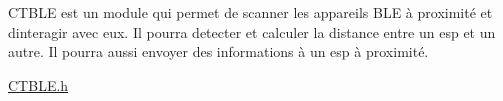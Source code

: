 CTBLE est un module qui permet de scanner les appareils BLE à proximité et d\textquotesingle{}interagir avec eux. Il pourra detecter et calculer la distance entre un esp et un autre. Il pourra aussi envoyer des informations à un esp à proximité.

\mbox{\hyperlink{_c_t_b_l_e_8h}{CTBLE.\+h}} 